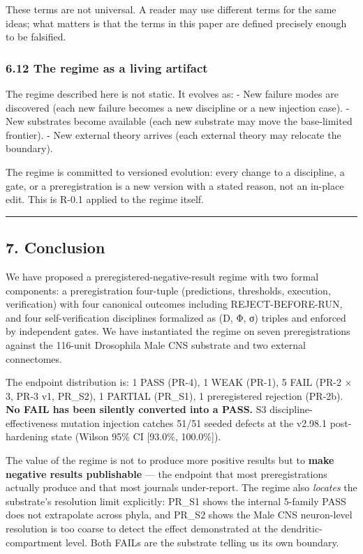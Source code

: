 \documentclass[
]{article}
\begin{document}
These terms are not universal. A reader may use different terms for the
same ideas; what matters is that the terms in this paper are defined
precisely enough to be falsified.

\subsubsection{6.12 The regime as a living
artifact}\label{the-regime-as-a-living-artifact}

The regime described here is not static. It evolves as: - New failure
modes are discovered (each new failure becomes a new discipline or a new
injection case). - New substrates become available (each new substrate
may move the base-limited frontier). - New external theory arrives (each
external theory may relocate the boundary).

The regime is committed to versioned evolution: every change to a
discipline, a gate, or a preregistration is a new version with a stated
reason, not an in-place edit. This is R-0.1 applied to the regime
itself.

\begin{center}\rule{0.5\linewidth}{0.5pt}\end{center}

\subsection{7. Conclusion}\label{conclusion}

We have proposed a preregistered-negative-result regime with two formal
components: a preregistration four-tuple (predictions, thresholds,
execution, verification) with four canonical outcomes including
REJECT-BEFORE-RUN, and four self-verification disciplines formalized as
(D, Φ, σ) triples and enforced by independent gates. We have
instantiated the regime on seven preregistrations against the 116-unit
Drosophila Male CNS substrate and two external connectomes.

The endpoint distribution is: 1 PASS (PR-4), 1 WEAK (PR-1), 5 FAIL (PR-2
× 3, PR-3 v1, PR\_S2), 1 PARTIAL (PR\_S1), 1 preregistered rejection
(PR-2b). \textbf{No FAIL has been silently converted into a PASS.} S3
discipline-effectiveness mutation injection catches 51/51 seeded defects
at the v2.98.1 post-hardening state (Wilson 95\% CI {[}93.0\%,
100.0\%{]}).

The value of the regime is not to produce more positive results but to
\textbf{make negative results publishable} --- the endpoint that most
preregistrations actually produce and that most journals under-report.
The regime also \emph{locates} the substrate's resolution limit
explicitly: PR\_S1 shows the internal 5-family PASS does not extrapolate
across phyla, and PR\_S2 shows the Male CNS neuron-level resolution is
too coarse to detect the effect \citet{ref35} demonstrated at the
dendritic-compartment level. Both FAILs are the substrate telling us its
own boundary.
\end{document}
